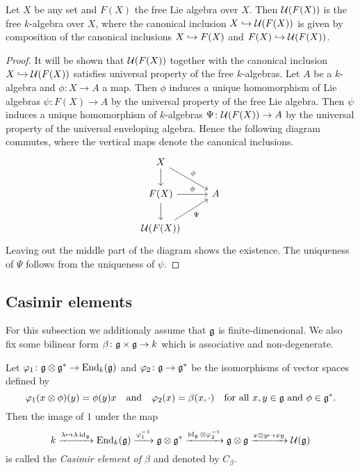 \begin{lem}
 Let $X$ be any set and $F(X)$ the free Lie algebra over $X$. Then $\mathcal{U}(F(X))$ is the free $k$-algebra over $X$, where the canonical inclusion $X \hookrightarrow \mathcal{U}(F(X))$ is given by composition of the canonical inclusions $X \hookrightarrow F(X)$ and $F(X) \hookrightarrow \mathcal{U}(F(X))$.
\end{lem}
\begin{proof}
 It will be shown that $\mathcal{U}(F(X))$ together with the canonical inclusion $X \hookrightarrow \mathcal{U}(F(X))$ satisfies universal property of the free $k$-algebras. Let $A$ be a $k$-algebra and $\phi \colon X \to A$ a map. Then $\phi$ induces a unique homomorphism of Lie algebras $\psi \colon F(X) \to A$ by the universal property of the free Lie algebra. Then $\psi$ induces a unique homomorphism of $k$-algebras $\Psi \colon \mathcal{U}(F(X)) \to A$ by the universal property of the universal enveloping algebra. Hence the following diagram commutes, where the vertical maps denote the canonical inclusions.
 \[
   \begin{tikzcd}
     X
     \arrow{dr}[above right]{\phi}
     \arrow{d}
     &
     {}
     \\
     F(X)
     \arrow{r}[above]{\phi}
     \arrow{d}
     &
     A
     \\
     \Ue(F(X))
     \arrow{ur}[below right]{\Psi}
     &
     {}
   \end{tikzcd}
 \]
 Leaving out the middle part of the diagram shows the existence. The uniqueness of $\Psi$ follows from the uniqueness of $\psi$.
\end{proof}










\subsection{Casimir elements}
For this subsection we additionaly assume that $\mathfrak{g}$ is finite-dimensional. We also fix some bilinear form $\beta \colon \mathfrak{g} \times \mathfrak{g} \to k$ which is associative and non-degenerate.


\begin{defi}\label{defi: definition of Casimir element}
 Let $\varphi_1 \colon \mathfrak{g} \otimes \mathfrak{g}^* \to \operatorname{End}_k(\mathfrak{g})$ and $\varphi_2 \colon \mathfrak{g} \to \mathfrak{g}^*$ be the isomorphisms of vector spaces defined by
 \[
  \varphi_1(x \otimes \phi)(y) = \phi(y) x
  \quad\text{and}\quad
  \varphi_2(x) = \beta(x, \cdot)
  \quad\text{for all $x,y \in \mathfrak{g}$ and $\phi \in \mathfrak{g}^*$}.
 \]
 Then the image of $1$ under the map
 \begin{equation}\label{eqn: Casimir without coordinates}
  k
  \xrightarrow{\lambda \mapsto \lambda \operatorname{id}_{\mathfrak{g}}}
  \operatorname{End}_k(\mathfrak{g})
  \xrightarrow{\varphi_1^{-1}}
  \mathfrak{g} \otimes \mathfrak{g}^*
  \xrightarrow{\operatorname{id}_{\mathfrak{g}} \otimes \varphi_2^{-1}}
  \mathfrak{g} \otimes \mathfrak{g}
  \xrightarrow{x \otimes y \mapsto x y}
  \mathcal{U}(\mathfrak{g})
 \end{equation}
 is called the \emph{Casimir element of $\beta$} and denoted by $C_\beta$.
\end{defi}


